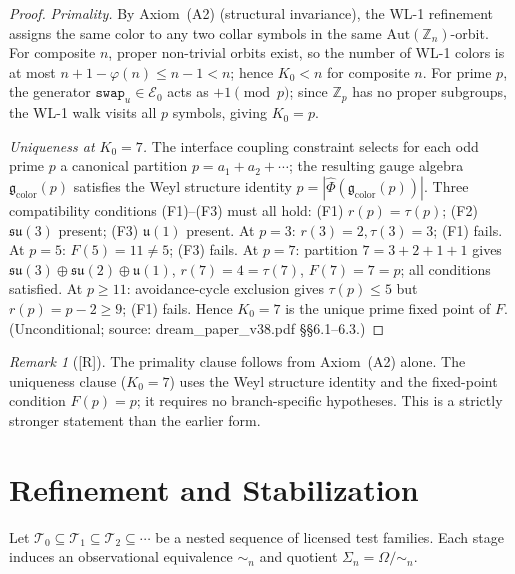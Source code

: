 \documentclass[12pt,oneside]{amsbook}
\theoremstyle{plain}
\theoremstyle{definition}
\theoremstyle{remark}
\newtheorem{remark}[theorem]{Remark}
\newcommand{\status}[1]{\textup{[#1]}}
\begin{document}
\begin{proof}
\textit{Primality.}  By Axiom~(A2) (structural invariance), the
WL-1 refinement assigns the same color to any two collar symbols
in the same $\mathrm{Aut}(\mathbb{Z}_n)$-orbit.  For composite $n$,
proper non-trivial orbits exist, so the number of WL-1 colors is
at most $n+1-\varphi(n) \leq n-1 < n$; hence $K_0 < n$ for
composite $n$.  For prime $p$, the generator
$\mathtt{swap}_u \in \mathcal{E}_0$ acts as $+1\pmod{p}$; since
$\mathbb{Z}_p$ has no proper subgroups, the WL-1 walk visits all
$p$ symbols, giving $K_0 = p$.

\textit{Uniqueness at $K_0 = 7$.}
The interface coupling constraint selects for each odd prime $p$
a canonical partition $p = a_1 + a_2 + \cdots$; the resulting
gauge algebra $\mathfrak{g}_{\mathrm{color}}(p)$ satisfies the
Weyl structure identity $p = |\hat\Phi(\mathfrak{g}_{\mathrm{color}}(p))|$.
Three compatibility conditions (F1)--(F3) must all hold:
(F1) $r(p)=\tau(p)$; (F2) $\mathfrak{su}(3)$ present; (F3) $\mathfrak{u}(1)$ present.
At $p=3$: $r(3)=2,\tau(3)=3$; (F1) fails.
At $p=5$: $F(5)=11\neq 5$; (F3) fails.
At $p=7$: partition $7=3+2+1+1$ gives
$\mathfrak{su}(3)\oplus\mathfrak{su}(2)\oplus\mathfrak{u}(1)$,
$r(7)=4=\tau(7)$, $F(7)=7=p$; all conditions satisfied.
At $p\geq 11$: avoidance-cycle exclusion gives $\tau(p)\leq 5$
but $r(p)=p-2\geq 9$; (F1) fails.
Hence $K_0=7$ is the unique prime fixed point of $F$.
(Unconditional; source: dream\_paper\_v38.pdf \S\S6.1--6.3.)
\end{proof}


\begin{remark}[\status{R}]
The primality clause follows from Axiom~(A2) alone.  The uniqueness
clause ($K_0=7$) uses the Weyl structure identity and the fixed-point
condition $F(p)=p$; it requires no branch-specific hypotheses.  This
is a strictly stronger statement than the earlier form.
\end{remark}

\section{Refinement and Stabilization}

Let $\mathcal{T}_0 \subseteq \mathcal{T}_1 \subseteq \mathcal{T}_2
\subseteq \cdots$ be a nested sequence of licensed test families.
Each stage induces an observational equivalence $\sim_n$ and quotient
$\Sigma_n = \Omega/{\sim_n}$.
\end{document}
